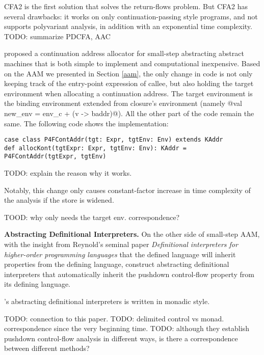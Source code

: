 \documentclass[acmsmall,review,anonymous]{acmart}\settopmatter{printfolios=true,printccs=false,printacmref=false}
\begin{document}
CFA2 is the first solution that solves the return-flows problem\cite{vardoulakis2010cfa2}.
But CFA2 has several drawbacks: it works on only continuation-passing style programs, 
and not supports polyvariant analysis, in addition with an exponential time complexity.
TODO: summarize PDCFA, AAC

\citeauthor{gilray2016pushdown} proposed a continuation address allocator for 
small-step abstracting abstract machines that is both simple to implement and
computational inexpensive. 
Based on the AAM we presented in Section \ref{aam}, the only change in code is
not only keeping track of the entry-point expression of callee, but also holding the target environment
when allocating a continuation address.
The target environment is the binding environment extended from closure's environment
(namely @val new_env = env_c + (v -> baddr)@). All the other part of the code remain the same.
The following code shows the implementation:

\begin{lstlisting}
case class P4FContAddr(tgt: Expr, tgtEnv: Env) extends KAddr
def allocKont(tgtExpr: Expr, tgtEnv: Env): KAddr = P4FContAddr(tgtExpr, tgtEnv)
\end{lstlisting}

TODO: explain the reason why it works.

Notably, this change only causes constant-factor increase in time complexity of 
the analysis if the store is widened.

TOOD: why only needs the target env. correspondence?

\textbf{Abstracting Definitional Interpreters.}
On the other side of small-step AAM, with the insight from Reynold's seminal paper 
\emph{Definitional interpreters for higher-order programming languages} \cite{reynolds1972definitional}
that the defined language will inherit properties from the defining language, 
\citeauthor{darais2017abstracting} construct abstracting 
definitional interpreters that automatically inherit the pushdown control-flow 
property from its defining language.

\citeauthor{darais2017abstracting}'s abstracting definitional interpreters is written
in monadic style.

TODO: connection to this paper.
TODO: delimited control vs monad. correspondence since the very beginning time.
TODO: although they establish pushdown control-flow analysis in different ways, 
is there a correspondence between different methods?
\end{document}
